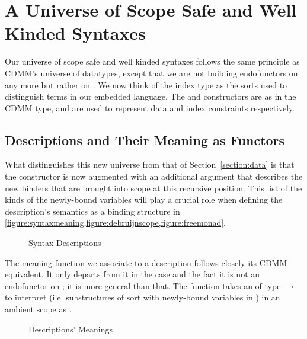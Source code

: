 \chapter{A Universe of Scope Safe and Well Kinded Syntaxes}\label{chapter:universe}

Our universe of scope safe and well kinded syntaxes follows the same principle
as CDMM's universe of datatypes, except that we are not building endofunctors on
 any more but rather on { }. We now think of the index
type  as the sorts used to distinguish terms in our embedded language.
The  and  constructors are as in the CDMM  type,
and are used to represent data and index constraints respectively.

\section{Descriptions and Their Meaning as Functors}

What distinguishes this new universe  from that of Section~\ref{section:data}
is that the  constructor is now augmented with an additional { }
argument that describes the new binders that are brought into scope at this recursive
position. This list of the kinds of the newly-bound variables will play a crucial role when
defining the description's semantics as a binding structure in
\cref{figure:syntaxmeaning,figure:debruijnscope,figure:freemonad}.

\begin{figure}[h]
\caption{Syntax Descriptions}
\end{figure}

The meaning function  we associate to a description follows closely
its CDMM equivalent. It only departs from it in the  case and the fact
it is not an endofunctor on  ; it is more general than that.
The function takes an  of type {  $\rightarrow$  }
to interpret {  } (i.e. substructures of sort  with
newly-bound variables in ) in an ambient scope  as {   }.

\begin{figure}[h]
\caption{Descriptions' Meanings}\label{figure:syntaxmeaning}
\end{figure}

